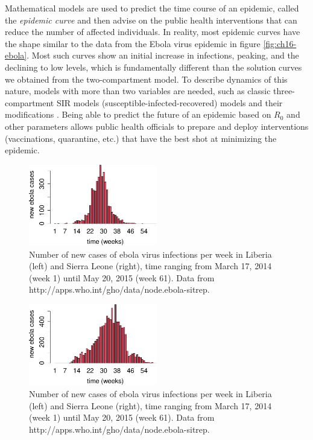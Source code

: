 \documentclass[
  letterpaper,
  DIV=11,
  numbers=noendperiod]{scrreprt}
\begin{document}
Mathematical models are used to predict the time course of an epidemic,
called the  \emph{epidemic curve} and then advise
on the public health interventions that can reduce the number of
affected individuals. In reality, most epidemic curves have the shape
similar to the data from the Ebola virus epidemic in figure
\ref{fig:ch16-ebola}. Most such curves show an initial increase in
infections, peaking, and the declining to low levels, which is
fundamentally different than the solution curves we obtained from the
two-compartment model. To describe dynamics of this nature, models with
more than two variables are needed, such as classic three-compartment
SIR models (susceptible-infected-recovered) models and their
modifications \cite{brauer_mathematical_2011}. Being able to predict the
future of an epidemic based on \(R_0\) and other parameters allows
public health officials to prepare and deploy interventions
(vaccinations, quarantine, etc.) that have the best shot at minimizing
the epidemic.

\begin{figure}

{\centering \includegraphics[width=0.5\textwidth,height=\textheight]{./graph_odes_files/figure-pdf/ch7-ebola-1.pdf}

}

\caption{Number of new cases of ebola virus infections per week in
Liberia (left) and Sierra Leone (right), time ranging from March 17,
2014 (week 1) until May 20, 2015 (week 61). Data from
http://apps.who.int/gho/data/node.ebola-sitrep.}

\end{figure}

\begin{figure}

{\centering \includegraphics[width=0.5\textwidth,height=\textheight]{./graph_odes_files/figure-pdf/ch7-ebola-2.pdf}

}

\caption{Number of new cases of ebola virus infections per week in
Liberia (left) and Sierra Leone (right), time ranging from March 17,
2014 (week 1) until May 20, 2015 (week 61). Data from
http://apps.who.int/gho/data/node.ebola-sitrep.}

\end{figure}
\end{document}
